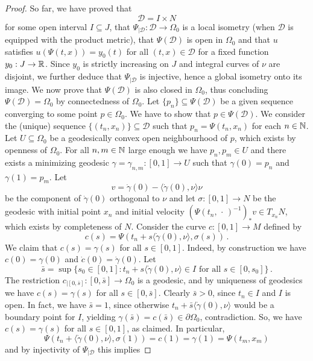 \documentclass[10 pt,a4paper]{article}
\theoremstyle{definition}
\begin{document}
\begin{proof}
	So far, we have proved that
	\[
		\mathscr D = I \times N
	\]
	for some open interval $I\subseteq J$, that $\Psi_{|\mathscr D} : \mathscr D \to \Omega_0$ is a local isometry (when $\mathscr D$ is equipped with the product metric), that $\Psi(\mathscr D)$ is open in $\Omega_0$ and that $u$ satisfies $u(\Psi(t,x)) = y_0(t)$ for all $(t,x) \in \mathscr D$ for a fixed function $y_0 : J \to \mathbb R$. Since $y_0$ is strictly increasing on $J$ and integral curves of $\nu$ are disjoint, we further deduce that $\Psi_{|\mathscr D}$ is injective, hence a global isometry onto its image. We now prove that $\Psi(\mathscr D)$ is also closed in $\Omega_0$, thus concluding $\Psi(\mathscr D) = \Omega_0$ by connectedness of $\Omega_0$. Let $\{p_n\}\subseteq \Psi(\mathscr{D})$ be a given sequence converging to some point $p \in \Omega_0$. We have to show that $p \in \Psi(\mathscr{D})$. We consider the (unique) sequence $\{(t_n,x_n)\} \subseteq \mathscr D$ such that $p_n = \Psi(t_n,x_n)$ for each $n\in\mathbb N$. Let $U\subseteq\Omega_0$ be a geodesically convex open neighbourhood of $p$, which exists by openness of $\Omega_0$. For all $n,m\in\mathbb N$ large enough we have $p_n,p_m\in U$ and there exists a minimizing geodesic $\gamma = \gamma_{n,m} : [0,1] \to U$ such that $\gamma(0) = p_n$ and $\gamma(1) = p_m$. Let
	\[
		v = \dot\gamma(0) - \langle\dot\gamma(0),\nu\rangle \nu
	\]
	be the component of $\dot\gamma(0)$ orthogonal to $\nu$ and let $\sigma : [0,1] \to N$ be the geodesic with initial point $x_n$ and initial velocity $(\Psi(t_n,\,\cdot\,)^{-1})_\ast v \in T_{x_n} N$, which exists by completeness of $N$. Consider the curve $c : [0,1] \to M$ defined by
	\[
		c(s) = \Psi(t_n+s\langle\dot\gamma(0),\nu\rangle,\sigma(s)) \, .
	\]
	We claim that $c(s) = \gamma(s)$ for all $s\in[0,1]$. Indeed, by construction we have $c(0) = \gamma(0)$ and $\dot c(0) = \dot\gamma(0)$. Let
	\[
		\bar s = \sup\{ s_0 \in [0,1] : t_n + s\langle\dot\gamma(0),\nu\rangle \in I \text{ for all } s \in [0,s_0] \} \, .
	\]
	The restriction $c_{|[0,\bar s]} : [0,\bar s] \to \Omega_0$ is a geodesic, and by uniqueness of geodesics we have $c(s) = \gamma(s)$ for all $s\in[0,\bar s]$. Clearly $\bar s > 0$, since $t_n \in I$ and $I$ is open. In fact, we have $\bar s = 1$, since otherwise $t_n + \bar s\langle\dot\gamma(0),\nu\rangle$ would be a boundary point for $I$, yielding $\gamma(\bar s) = c(\bar s) \in \partial\Omega_0$, contradiction. So, we have $c(s) = \gamma(s)$ for all $s\in[0,1]$, as claimed. In particular,
	\[
		\Psi(t_n + \langle\dot\gamma(0),\nu\rangle,\sigma(1)) = c(1) = \gamma(1) = \Psi(t_m,x_m)
	\]
	and by injectivity of $\Psi_{|\mathscr D}$ this implies

\end{proof}
\end{document}
